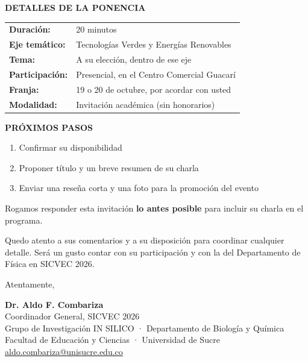 \documentclass[11pt,a4paper]{article}
\begin{document}
\vspace{0.1cm}

\noindent
\textbf{DETALLES DE LA PONENCIA}

\begin{tabular}{ll}
\textbf{Duración:} & 20 minutos \\
\textbf{Eje temático:} & Tecnologías Verdes y Energías Renovables \\
\textbf{Tema:} & A su elección, dentro de ese eje \\
\textbf{Participación:} & Presencial, en el Centro Comercial Guacarí \\
\textbf{Franja:} & 19 o 20 de octubre, por acordar con usted \\
\textbf{Modalidad:} & Invitación académica (sin honorarios) \\
\end{tabular}

\vspace{0.1cm}

\noindent
\textbf{PRÓXIMOS PASOS}

\begin{enumerate}\setlength{\itemsep}{0pt}
  \item Confirmar su disponibilidad
  \item Proponer título y un breve resumen de su charla
  \item Enviar una reseña corta y una foto para la promoción del evento
\end{enumerate}

Rogamos responder esta invitación \textbf{lo antes posible} para incluir su charla en el programa.

\vspace{0.1cm}

Quedo atento a sus comentarios y a su disposición para coordinar cualquier detalle. Será un gusto contar con su participación y con la del Departamento de Física en SICVEC 2026.

\vspace{0.15cm}

Atentamente,

\vspace{0.15cm}

\textbf{Dr. Aldo F. Combariza}\\
Coordinador General, SICVEC 2026\\
Grupo de Investigación IN SILICO · Departamento de Biología y Química\\
Facultad de Educación y Ciencias · Universidad de Sucre\\
\href{mailto:aldo.combariza@unisucre.edu.co}{aldo.combariza@unisucre.edu.co}
\end{document}
